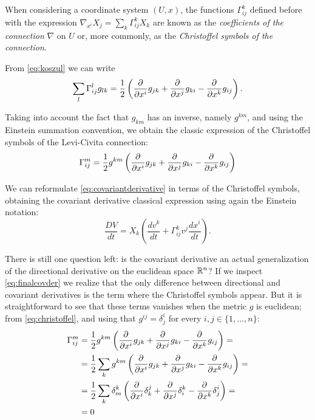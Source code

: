 \begin{remark}
	When considering a coordinate system $(U,x)$, the functions $\Gamma^k_{ij}$ defined before with the expression $\nabla_{x^i}X_j = \sum_k \Gamma^k_{ij} X_k$ are known as the \emph{coefficients of the connection} $\nabla$ on $U$ or, more commonly, as the \emph{Christoffel symbols of the connection}.
	
	From \autoref{eq:koszul} we can write
	\[
		\sum_l \Gamma^l_{ij}g_{lk} = \frac{1}{2} \left( \frac{\partial^{} }{\partial x^i} g_{jk} + \frac{\partial^{} }{\partial x^j} g_{ki} - \frac{\partial^{} }{\partial x^k}g_{ij} \right).
	\]
	
	Taking into account the fact that $g_{km}$ has an inverse, namely $g^{km}$, and using the Einstein summation convention, we obtain the classic expression of the Christoffel symbols of the Levi-Civita connection:
	\begin{equation}
		\label{eq:christoffel}
		\Gamma^m_{ij} = \frac{1}{2} g^{km} \left( \frac{\partial^{} }{\partial x^i} g_{jk} + \frac{\partial^{} }{\partial x^j} g_{ki} - \frac{\partial^{} }{\partial x^k}g_{ij} \right)
	\end{equation}
	
	We can reformulate \autoref{eq:covariantderivative} in terms of the Christoffel symbols, obtaining the covariant derivative classical expression using again the Einstein notation:
	\begin{equation}
		\label{eq:finalcovder}
		\frac{DV}{dt} = X_k \left( \frac{dv^k}{dt} + \Gamma^k_{ij} v^j \frac{d x^i}{dt} \right).
	\end{equation}
\end{remark}

There is still one question left: is the covariant derivative an actual generalization of the directional derivative on the euclidean space $\mathbb{R}^n$? If we inspect \autoref{eq:finalcovder} we realize that the only difference between directional and covariant derivatives is the term where the Christoffel symbols appear. But it is straightforward to see that these terms vanishes when the metric $g$ is euclidean; from \autoref{eq:christoffel}, and using that $g^{ij} = \delta^i_j$ for every $i,j \in \{1, \dots, n\}$:
\begin{align*}
	\Gamma^m_{ij} &= \frac{1}{2} g^{km} \left( \frac{\partial^{} }{\partial x^i} g_{jk} + \frac{\partial^{} }{\partial x^j} g_{ki} - \frac{\partial^{} }{\partial x^k}g_{ij} \right) = \\
	&= \frac{1}{2} \sum_k g^{km} \left( \frac{\partial^{} }{\partial x^i} g_{jk} + \frac{\partial^{} }{\partial x^j} g_{ki} - \frac{\partial^{} }{\partial x^k}g_{ij} \right) = \\
	&= \frac{1}{2} \sum_k \delta^k_m \left( \frac{\partial^{} }{\partial x^i} \delta^j_k + \frac{\partial^{} }{\partial x^j} \delta^k_i - \frac{\partial^{} }{\partial x^k} \delta^i_j \right) = \\
	&= 0
\end{align*}

